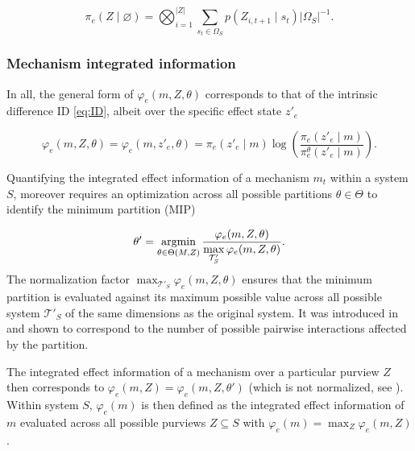 \documentclass[preprints, article, accept, pdftex, moreauthors, letterpaper]{Definitions/mdpi}
\renewcommand{\=}[1]{\stackrel{#1}{=}} %
\newcommand{\ID}{\text{ID}}
\newcommand{\T}{\mathcal{T}} %
\newcommand{\p}{\theta} %
\newcommand{\Part}{\Theta}
\renewcommand{\*}{\otimes}%
\newcommand*{\argmin}{\operatornamewithlimits{argmin}\limits}
\begin{document}
\begin{equation}
\label{eq:FPCE}
    \pi_e(Z\mid \varnothing) = \bigotimes_{i=1}^{|Z|} \sum_{s_{t} \in \Omega_{S}} p(Z_{i, t+1} \mid s_{t}) |\Omega_{S}|^{-1}.
\end{equation}
%

\subsubsection{Mechanism integrated information}

In all, the general form of $\varphi_e(m,Z,\p)$ corresponds to that of the intrinsic difference $\ID$ \eqref{eq:ID}, albeit over the specific effect state $z'_e$

\begin{equation}
\label{eq:phi}
    \varphi_e(m,Z,\theta) = \varphi_e(m, z'_e, \theta) = \pi_e(z'_e \mid m) \log \left( \frac{\pi_e(z'_e \mid m)}{\pi_e^\theta(z'_e \mid m)} \right).
\end{equation}

Quantifying the integrated effect information of a mechanism $m_t$ within a system $S$, moreover requires an optimization across all possible partitions $\p \in \Part$ to identify the minimum partition (MIP) 

\begin{equation}
\label{eq:mip}
\p' = \argmin_{\p \in \Theta(M,Z)} \frac{\varphi_e(m,Z,\theta)}{\displaystyle\max_{\T'_S} \varphi_e(m,Z,\theta)}.
\end{equation}
%
The normalization factor $\max_{\T'_S} \varphi_e(m,Z,\theta)$ ensures that the minimum partition is evaluated against its maximum possible value across all possible system $\T'_S$ of the same dimensions as the original system. It was introduced in \cite{Albantakis2022_4_0} and shown to correspond to the number of possible pairwise interactions affected by the partition.

The integrated effect information of a mechanism over a particular purview $Z$ then corresponds to $\varphi_e(m, Z) = \varphi_e(m, Z, \p')$ (which is not normalized, see \cite{Albantakis2022_4_0}).
Within system $S$, $\varphi_e(m)$ is then defined as the integrated effect information of $m$ evaluated across all possible purviews $Z \subseteq S$ with $\displaystyle\varphi_e(m) = \max_Z \varphi_e(m, Z)$. 
\end{document}
